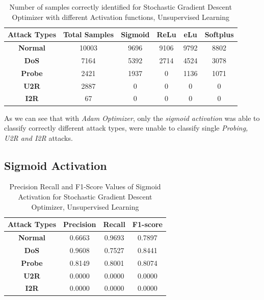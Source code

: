 \documentclass[12pt, a4paper]{report}
\begin{document}
\begin{appendices}
 
	\begin{table}[h]
	\centering
	\captionsetup{justification=centering,margin=2cm}
	\begin{tabular}{|c|c|c|c|c|c|}
	\hline
	\textbf{Attack Types} & \textbf{Total Samples} & \textbf{Sigmoid} & \textbf{ReLu} & \textbf{eLu} & \textbf{Softplus} \\ \hline
	\textbf{Normal}       & 10003                  & 9696            & 9106         & 9792        & 8802           \\ \hline
	\textbf{DoS}          & 7164                  & 5392            & 2714         & 4524        & 3078             \\ \hline
	\textbf{Probe}        & 2421                  & 1937             & 0          & 1136         & 1071              \\ \hline
	\textbf{U2R}          & 2887                    & 0             & 0           & 0          & 0               \\ \hline
	\textbf{I2R}          & 67                     & 0               & 0            & 0           & 0                \\ \hline
	\end{tabular}
	\caption{Number of samples correctly identified for Stochastic Gradient Descent Optimizer with different Activation functions, Unsupervised Learning}
	\label{confusion_sgd_tf}
	\end{table}
  
  As we can see that with \textit{Adam Optimizer}, only the \textit{sigmoid activation} was able to classify correctly different attack types, were unable to classify single \textit{Probing, U2R and I2R} attacks.
   \clearpage
   \subsection{Sigmoid Activation}
 	 \begin{table}[ht]
		\centering
		\captionsetup{justification=centering,margin=2cm}
		\begin{tabular}{|c|c|c|c|}
		\hline
		\textbf{Attack Types} & \textbf{Precision} & \textbf{Recall} & \textbf{F1-score} \\ \hline
		\textbf{Normal}       & 0.6663             & 0.9693          & 0.7897            \\ \hline
		\textbf{DoS}          & 0.9608             & 0.7527          & 0.8441            \\ \hline
		\textbf{Probe}        & 0.8149             & 0.8001          & 0.8074            \\ \hline
		\textbf{U2R}          & 0.0000             & 0.0000          & 0.0000            \\ \hline
		\textbf{I2R}          & 0.0000             & 0.0000          & 0.0000            \\ \hline
		\end{tabular}
		\caption{Precision Recall and F1-Score Values of Sigmoid Activation for Stochastic Gradient Descent Optimizer, Unsupervised Learning}
		\label{classification sigmoid sgd tf}
		\end{table} 
  

\end{appendices}
\end{document}

